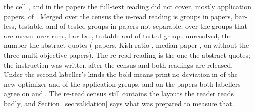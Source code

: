 \documentclass[preprint,review,12pt]{elsarticle}
\begin{document}
the cell \nCrcRlSameCellBarless{}, and in the papers the full-text reading did not cover, mostly application papers, \nCrcRlUnreadBarless{} of \nCrcRlUnreadGroups{}. Merged over the census the re-read reading is \nCrcAllGroups{} groups in \nCrcAllPapers{} papers, \nCrcAllNeither{} \nCrcAllNeitherCi{} bar-less, \nCrcAllTestable{} \nCrcAllTestableCi{} testable, and \nCrcAllFail{} \nCrcAllFailCi{} of \nCrcAllTested{} tested groups in \nCrcAllTestedPapers{} papers not separable; over the groups that are means over runs, \nCrcMeansNeither{} \nCrcMeansNeitherCi{} bar-less, \nCrcMeansTestable{} testable and \nCrcMeansFail{} \nCrcMeansFailCi{} of \nCrcMeansTested{} tested groups unresolved, the number the abstract quotes (\nCrcPpmPapers{} papers, Kish ratio \nCrcPpmEffectivePapers{}, median paper \nCrcPpmMedianRate{}, \nCrcPpmWithoutTopThreeFail{} on \nCrcPpmWithoutTopThreeTested{} without the three multi-objective papers). The re-read reading is the one the abstract quotes; the instruction was written after the census and both readings are released. Under the second labeller's kinds the bold means print no deviation in \nCrcKsecMeansNewOptimizerNeither{} of the new-optimizer and \nCrcKsecMeansApplicationNeither{} of the application groups, and on the papers both labellers agree on \nCrcKbothMeansNewOptimizerNeither{} and \nCrcKbothMeansApplicationNeither{}. The re-read census still contains the layouts the reader reads badly, and Section~\ref{sec:validation} says what was prepared to measure that.
\end{document}
